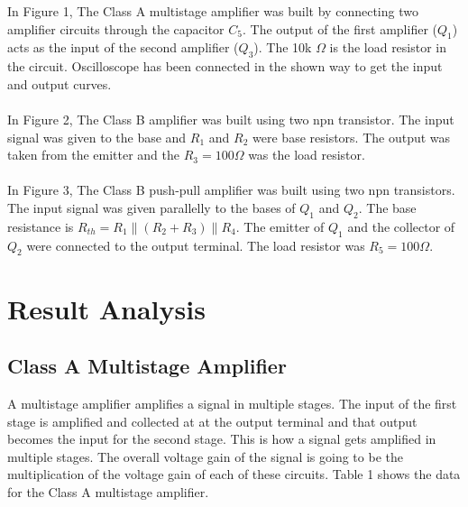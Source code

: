 \documentclass[12pt]{article}
\begin{document}
In Figure 1, The Class A multistage amplifier was built by connecting two amplifier circuits through the capacitor $C_5$. The output of the first amplifier ($Q_1$) acts as the input of the second amplifier ($Q_3$). The 10k $\Omega$ is the load resistor in the circuit. Oscilloscope has been connected in the shown way to get the input and output curves. \\~\\

In Figure 2, The Class B amplifier was built using two npn transistor. The input signal was given to the base and $R_1$ and $R_2$ were base resistors. The output was taken from the emitter and the $R_3 = 100 \Omega$ was the load resistor. \\~\\

In Figure 3, The Class B push-pull amplifier was built using two npn transistors. The input signal was given parallelly to the bases of $Q_1$ and $Q_2$. The base resistance is $R_{th} = R_1 \| (R_2 + R_3) \| R_4$. The emitter of $Q_1$ and the collector of $Q_2$ were connected to the output terminal. The load resistor was $R_5 = 100 \Omega$.

\newpage
\section{Result Analysis}

\subsection{Class A Multistage Amplifier}
A multistage amplifier amplifies a signal in multiple stages. The input of the first stage is amplified and collected at at the output terminal and that output becomes the input for the second stage. This is how a signal gets amplified in multiple stages. The overall voltage gain of the signal is going to be the multiplication of the voltage gain of each of these circuits. Table 1 shows the data for the Class A multistage amplifier.
\end{document}
